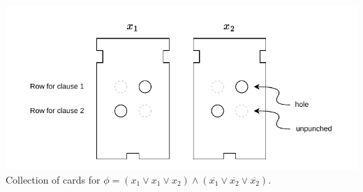 \documentclass[11pt]{article}
\begin{document}
\begin{center}
\includegraphics[scale=1.0]{Figures/Problem7.28.pdf} \\
Collection of cards for $\phi = (x_1 \vee x_1 \vee x_2) \wedge (\overline{x_1} \vee \overline{x_2} \vee \overline{x_2})$.
\end{center}
\end{document}

